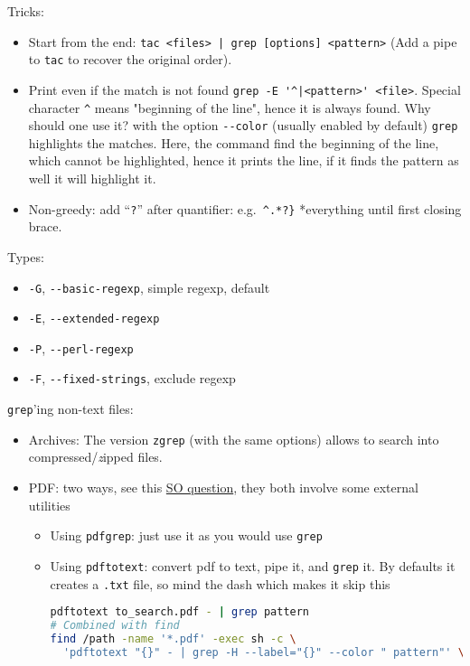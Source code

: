 \documentclass[a4paper,12pt,%
              final%
              ]{article}
\begin{document}
Tricks:
\begin{itemize}
  \item Start from the end: \verb!tac <files> | grep [options] <pattern>! (Add a pipe to \texttt{tac} to recover the original order).
  \item Print even if the match is not found \verb!grep -E '^|<pattern>' <file>!. Special character \verb|^| means "beginning of the line", hence it is always found. Why should one use it? with the option \verb|--color| (usually enabled by default) \verb|grep| highlights the matches. Here, the command find the beginning of the line, which cannot be highlighted, hence it prints the line, if it finds the pattern as well it will highlight it.
  \item Non-greedy: add ``\texttt{?}'' after quantifier: e.g.\ \verb|^.*?}| *everything until first closing brace.
\end{itemize}

Types:
\begin{itemize}
  \item \texttt{-G}, \verb|--basic-regexp|, simple regexp, default
  \item \texttt{-E}, \verb|--extended-regexp|
  \item \texttt{-P}, \verb|--perl-regexp|
  \item \texttt{-F}, \verb|--fixed-strings|, exclude regexp
\end{itemize}

\texttt{grep}'ing non-text files:
\begin{itemize}
  \item Archives: The version \texttt{zgrep} (with the same options) allows to search into compressed/\emph{z}ipped files.
  \item PDF: two ways, see this \href{https://unix.stackexchange.com/questions/6704/how-can-i-grep-in-pdf-files}{SO question}, they both involve some external utilities
    \begin{itemize}
      \item Using \texttt{pdfgrep}: just use it as you would use \texttt{grep}
      \item Using \texttt{pdftotext}: convert pdf to text, pipe it, and \texttt{grep} it. By defaults it creates a \texttt{.txt} file, so mind the dash which makes it skip this
\begin{lstlisting}[language=bash]
pdftotext to_search.pdf - | grep pattern
# Combined with find
find /path -name '*.pdf' -exec sh -c \
  'pdftotext "{}" - | grep -H --label="{}" --color " pattern"' \;
\end{lstlisting}
    \end{itemize}
\end{itemize}
\end{document}
